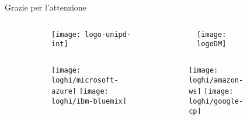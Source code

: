 %
\nonumber
\begin{frame}{Grazie per l'attenzione}
\begin{figure}[f]
\centering
	\begin{columns}
		\begin{column}{0.5\paperwidth}
			\begin{figure}[!h]
			\texttt{[image: logo-unipd-int]}
			\end{figure}
		\end{column}
		\begin{column}{0.5\textwidth}
			\begin{figure}[!h]
			\texttt{[image: logoDM]}
			\end{figure}
		\end{column}
	\end{columns}
	\vspace{10px}
	\begin{columns}
		\begin{column}{0.5\paperwidth}
			\begin{figure}[!h]
				\texttt{[image: loghi/microsoft-azure]}
				\vfill
				\vspace{20px}
				\texttt{[image: loghi/ibm-bluemix]}
			\end{figure}
		\end{column}
		\begin{column}{0.5\textwidth}
			\begin{figure}[!h]
				\texttt{[image: loghi/amazon-ws]}
				\vfill
				\vspace{20px}
				\texttt{[image: loghi/google-cp]}
			\end{figure}
		\end{column}
	\end{columns}
\end{figure}
\end{frame}
%
